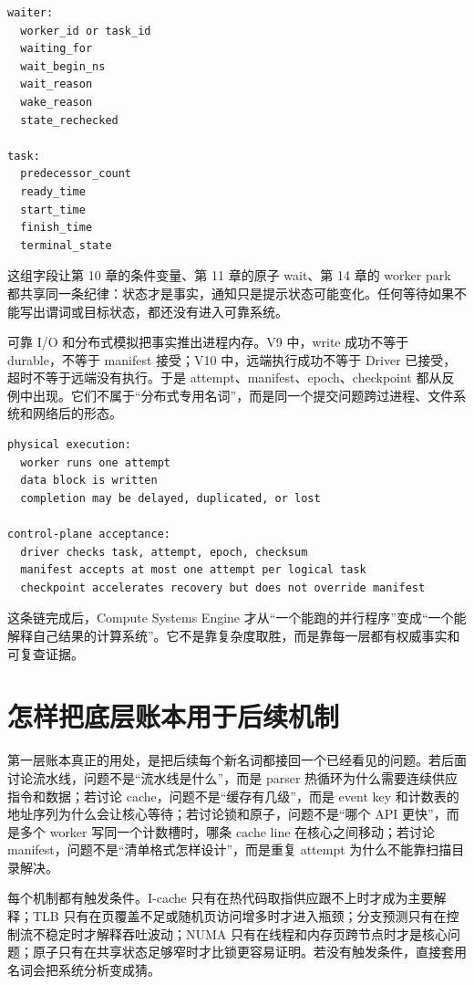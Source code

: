 \begin{lstlisting}[numbers=none,caption={等待状态的统一字段}]
waiter:
  worker_id or task_id
  waiting_for
  wait_begin_ns
  wait_reason
  wake_reason
  state_rechecked

task:
  predecessor_count
  ready_time
  start_time
  finish_time
  terminal_state
\end{lstlisting}

这组字段让第 10 章的条件变量、第 11 章的原子 wait、第 14 章的 worker park 都共享同一条纪律：状态才是事实，通知只是提示状态可能变化。任何等待如果不能写出谓词或目标状态，都还没有进入可靠系统。

可靠 I/O 和分布式模拟把事实推出进程内存。V9 中，write 成功不等于 durable，不等于 manifest 接受；V10 中，远端执行成功不等于 Driver 已接受，超时不等于远端没有执行。于是 attempt、manifest、epoch、checkpoint 都从反例中出现。它们不属于“分布式专用名词”，而是同一个提交问题跨过进程、文件系统和网络后的形态。

\begin{lstlisting}[numbers=none,caption={V9/V10 提交链}]
physical execution:
  worker runs one attempt
  data block is written
  completion may be delayed, duplicated, or lost

control-plane acceptance:
  driver checks task, attempt, epoch, checksum
  manifest accepts at most one attempt per logical task
  checkpoint accelerates recovery but does not override manifest
\end{lstlisting}

这条链完成后，Compute Systems Engine 才从“一个能跑的并行程序”变成“一个能解释自己结果的计算系统”。它不是靠复杂度取胜，而是靠每一层都有权威事实和可复查证据。

\section{怎样把底层账本用于后续机制}

第一层账本真正的用处，是把后续每个新名词都接回一个已经看见的问题。若后面讨论流水线，问题不是“流水线是什么”，而是 parser 热循环为什么需要连续供应指令和数据；若讨论 cache，问题不是“缓存有几级”，而是 event key 和计数表的地址序列为什么会让核心等待；若讨论锁和原子，问题不是“哪个 API 更快”，而是多个 worker 写同一个计数槽时，哪条 cache line 在核心之间移动；若讨论 manifest，问题不是“清单格式怎样设计”，而是重复 attempt 为什么不能靠扫描目录解决。

每个机制都有触发条件。I-cache 只有在热代码取指供应跟不上时才成为主要解释；TLB 只有在页覆盖不足或随机页访问增多时才进入瓶颈；分支预测只有在控制流不稳定时才解释吞吐波动；NUMA 只有在线程和内存页跨节点时才是核心问题；原子只有在共享状态足够窄时才比锁更容易证明。若没有触发条件，直接套用名词会把系统分析变成猜。

